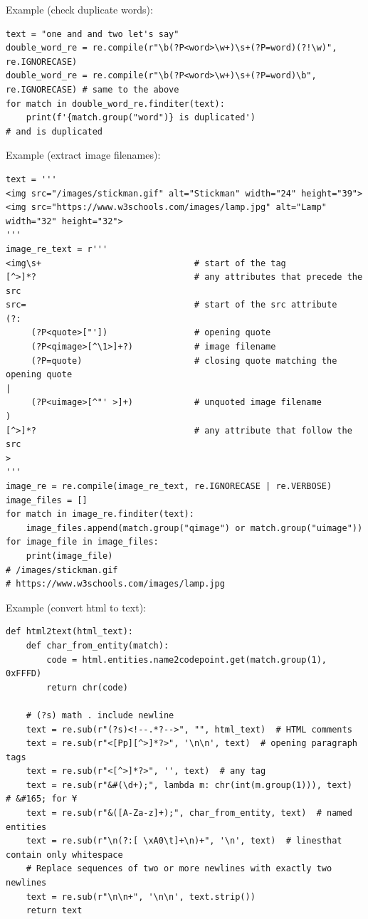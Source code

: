 Example (check duplicate words):
\begin{lstlisting}
text = "one and and two let's say"
double_word_re = re.compile(r"\b(?P<word>\w+)\s+(?P=word)(?!\w)", re.IGNORECASE)
double_word_re = re.compile(r"\b(?P<word>\w+)\s+(?P=word)\b", re.IGNORECASE) # same to the above
for match in double_word_re.finditer(text):
    print(f'{match.group("word")} is duplicated')
# and is duplicated
\end{lstlisting}


Example (extract image filenames):
\begin{lstlisting}
text = '''
<img src="/images/stickman.gif" alt="Stickman" width="24" height="39">
<img src="https://www.w3schools.com/images/lamp.jpg" alt="Lamp" width="32" height="32">
'''
image_re_text = r'''
<img\s+                              # start of the tag
[^>]*?                               # any attributes that precede the src
src=                                 # start of the src attribute
(?:
     (?P<quote>["'])                 # opening quote
     (?P<qimage>[^\1>]+?)            # image filename
     (?P=quote)                      # closing quote matching the opening quote
|
     (?P<uimage>[^"' >]+)            # unquoted image filename
)
[^>]*?                               # any attribute that follow the src
>     
'''
image_re = re.compile(image_re_text, re.IGNORECASE | re.VERBOSE)
image_files = []
for match in image_re.finditer(text):
    image_files.append(match.group("qimage") or match.group("uimage"))
for image_file in image_files:
    print(image_file)
# /images/stickman.gif
# https://www.w3schools.com/images/lamp.jpg  
\end{lstlisting}



Example (convert html to text):
\begin{lstlisting}
def html2text(html_text):
    def char_from_entity(match):
        code = html.entities.name2codepoint.get(match.group(1), 0xFFFD)
        return chr(code)

    # (?s) math . include newline
    text = re.sub(r"(?s)<!--.*?-->", "", html_text)  # HTML comments
    text = re.sub(r"<[Pp][^>]*?>", '\n\n', text)  # opening paragraph tags
    text = re.sub(r"<[^>]*?>", '', text)  # any tag
    text = re.sub(r"&#(\d+);", lambda m: chr(int(m.group(1))), text)  # &#165; for ¥
    text = re.sub(r"&([A-Za-z]+);", char_from_entity, text)  # named entities
    text = re.sub(r"\n(?:[ \xA0\t]+\n)+", '\n', text)  # linesthat contain only whitespace
    # Replace sequences of two or more newlines with exactly two newlines
    text = re.sub(r"\n\n+", '\n\n', text.strip())
    return text  
\end{lstlisting}


